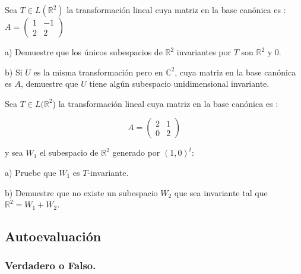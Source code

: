  \begin{exercise} 
  \item
 
 Sea $T \in L(\mathbb{R}^2)$ la transformación lineal 
cuya matriz en la base canónica es : $A=\left(\begin{array}{cc}1 & -1 \\2 & 2
\end{array}
 \right)$
 

a) Demuestre que los únicos subespacios de $\mathbb{R}^2$ invariantes por $T$ son  $\mathbb{R}^2$ y $0$.


b) Si $U$ es la misma transformación pero en $\mathbb{C}^2$, cuya matriz en la base canónica es $A$, demuestre que $U$ tiene algún subespacio unidimensional invariante.

\end{exercise} 

\begin{exercise} 
 \item
 
 Sea $T \in L(\mathbb{R}^2$) la transformación lineal 
cuya matriz en la base canónica es :

\[A=\left(\begin{array}{cc}2 & 1 \\0 & 2
\end{array}
 \right)\]
 
\noindent y sea $W_1$ el subespacio de $\mathbb{R}^2$  generado por $(1,0)^t$:
 
 \bigskip
 
a) Pruebe que $W_1$ es $T$-invariante.

b) Demuestre que no existe un subespacio $W_2$ que sea invariante tal que $\mathbb{R}^2=W_1+W_2$.


\end{exercise} 


 \bigskip
 
 \subsection{Autoevaluación}
\label{Auto3}
 \bigskip
 
 \subsubsection{Verdadero o Falso.}


\bigskip

